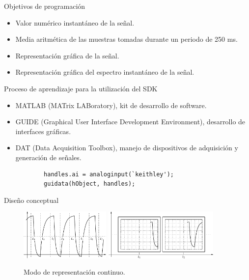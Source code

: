 \documentclass[utf8, compress]			{beamer}
\begin{document}
\begin{frame}{Objetivos de programación}
    \begin{itemize}
	\item Valor numérico instantáneo de la señal.
	\item Media aritmética de las muestras tomadas durante un
	    periodo de 250 ms.
	\item Representación gráfica de la señal.
	\item Representación gráfica del espectro instantáneo de la
	    señal.
    \end{itemize}
\end{frame}

\begin{frame}[fragile]{Proceso de aprendizaje para la utilización del SDK}
    \begin{itemize}
	\item MATLAB (MATrix LABoratory), kit de desarrollo de software.
	\item GUIDE (Graphical User Interface Development Environment),
	    desarrollo de interfaces gráficas.
	\item DAT (Data Acquisition Toolbox), manejo de dispositivos de
	    adquisición y generación de señales.
	    \vspace{\baselineskip}
	    \begin{lstlisting}
		handles.ai = analoginput(`keithley');
		guidata(hObject, handles);
	    \end{lstlisting}
    \end{itemize}
\end{frame}

\begin{frame}{Diseño conceptual}
    \begin{figure}
	\hfill
	\includegraphics[height=25mm, keepaspectratio]{ventanas.pdf}
	\hspace{1em}
	\includegraphics[height=25mm, keepaspectratio]{continuo.pdf}
	\hfill
	\caption{Modo de representación continuo.}
	\label{fig:continuous}
    \end{figure}
\end{frame}
\end{document}
